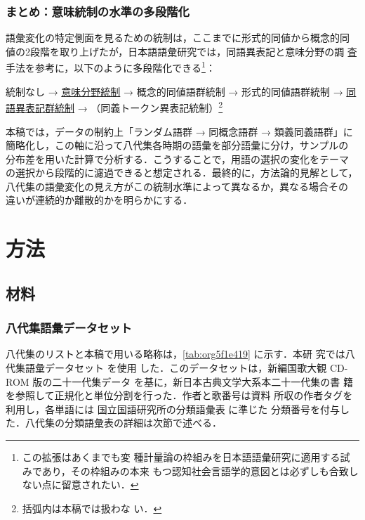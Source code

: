 \documentclass[submit]{ipsj}
\renewcommand{\ref}{\cref}
\begin{document}
\subsubsection{まとめ：意味統制の水準の多段階化}
\label{sec:orgca6c2b5}
語彙変化の特定側面を見るための統制は，ここまでに形式的同値から概念的同
値の2段階を取り上げたが，日本語語彙研究では，同語異表記と意味分野の調
査手法を参考に，以下のように多段階化できる\footnote{この拡張はあくまでも変
種計量論の枠組みを日本語語彙研究に適用する試みであり，その枠組みの本来
もつ認知社会言語学的意図とは必ずしも合致しない点に留意されたい．}：

統制なし → \uline{意味分野統制} → 概念的同値語群統制 → 形式的同値語群統制 → \uline{同
語異表記群統制} → （同義トークン異表記統制）\footnote{括弧内は本稿では扱わな
い．}

本稿では，データの制約上「ランダム語群 → 同概念語群 → 類義同義語群」に
簡略化し，この軸に沿って八代集各時期の語彙を部分語彙に分け，サンプルの
分布差を用いた計算で分析する．こうすることで，用語の選択の変化をテーマ
の選択から段階的に濾過できると想定される．最終的に，方法論的見解として，
八代集の語彙変化の見え方がこの統制水準によって異なるか，異なる場合その
違いが連続的か離散的かを明らかにする．
\section{方法\label{org192ec24}}
\label{sec:orgbe02ebd}
\subsection{材料\label{orgabfbe48}}
\label{sec:org134ea27}
\subsubsection{八代集語彙データセット\label{org07f039b}}
\label{sec:org43af8ad}
八代集のリストと本稿で用いる略称は，\ref{tab:org5f1e419} に示す．本研
究では八代集語彙データセット \cite{Hodoscek2022Developmenta}を使用
した．このデータセットは，新編国歌大観 CD-ROM 版の二十一代集データ
\cite{shinhen1996CDROM} を基に，新日本古典文学大系本二十一代集の書
籍を参照して正規化と単位分割を行った．作者と歌番号は資料
\cite{nakamura1999Kokubungaku} 所収の作者タグを利用し，各単語には
国立国語研究所の分類語彙表 \cite{nakano1994Bunruigoihyo} に準じた
分類番号を付与した．八代集の分類語彙表の詳細は次節で述べる．
\end{document}
